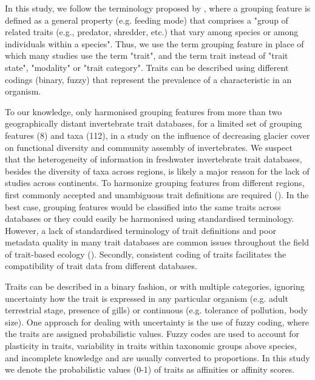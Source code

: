 \documentclass{article}
\begin{document}
In this study, we follow the terminology proposed by \citet{schmera_proposed_2015}, where a grouping feature is defined as a general property (e.g. feeding mode) that comprises a "group of related traits (e.g., predator, shredder, etc.) that vary among species or among individuals within a species". Thus, we use the term grouping feature in place of which many studies use the term "trait", and the term trait instead of "trait state", "modality" or "trait category". Traits can be described using different codings (binary, fuzzy) that represent the prevalence of a characteristic in an organism.

To our knowledge, only \citet{brown_functional_2018} harmonised grouping features from more than two geographically distant invertebrate trait databases, for a limited set of grouping features (8) and taxa (112), in a study on the influence of decreasing glacier cover on functional diversity and community assembly of invertebrates. We suspect that the heterogeneity of information in freshwater invertebrate trait databases, besides the diversity of taxa across regions, is likely a major reason for the lack of studies across continents. To harmonize grouping features from different regions, first commonly accepted and unambiguous trait definitions are required (\cite{schneider_towards_2019}). In the best case, grouping features would be classified into the same traits across databases or they could easily be harmonised using standardised terminology. However, a lack of standardised terminology of trait definitions and poor metadata quality in many trait databases are common issues throughout the field of trait-based ecology (\cite{baird_toward_2011, kissling_towards_2018}). Secondly, consistent coding of traits facilitates the compatibility of trait data from different databases. 

Traits can be described in a binary fashion, or with multiple categories, ignoring uncertainty how the trait is expressed in any particular organism (e.g. adult terrestrial stage, presence of gills) or continuous (e.g. tolerance of pollution, body size). One approach for dealing with uncertainty is the use of fuzzy coding, where the traits are assigned probabilistic values. Fuzzy codes are used to account for plasticity in traits, variability in traits within taxonomic groups above species, and incomplete knowledge and are usually converted to proportions. In this study we denote the probabilistic values (0-1) of traits as affinities or affinity scores.
\end{document}
